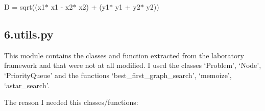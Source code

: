 \documentclass[12pt]{article}
\begin{document}
\begin{adjustwidth}{1.0in}{0.0in}
\begin{justify}
D = sqrt((x1$\ast$ x1 - x2$\ast$ x2) + (y1$\ast$ y1 + y2$\ast$  y2))
\end{justify}\par

\end{adjustwidth}

\subsection*{6.\hspace*{10pt}utils.py}
\begin{adjustwidth}{0.5in}{0.0in}
\begin{justify}
This module contains the classes and function extracted from the laboratory framework and that were not at all modified. I used the classes ‘Problem’, ‘Node’, ‘PriorityQueue’ and the functions ‘best\_first\_graph\_search’, ‘memoize’, ‘astar\_search’.
\end{justify}\par

\end{adjustwidth}

\begin{adjustwidth}{0.5in}{0.0in}
\begin{justify}
The reason I needed this classes/functions:
\end{justify}\par

\end{adjustwidth}
\end{document}
